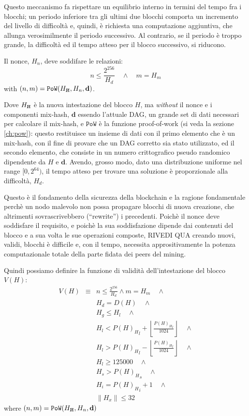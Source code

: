 \documentclass[9pt,oneside]{amsart}
\newcommand{\hcancel}[1]{%
    \tikz[baseline=(tocancel.base)]{
        \node[inner sep=0pt,outer sep=0pt] (tocancel) {#1};
        \draw[black] (tocancel.south west) -- (tocancel.north east);
    }%
}%
\begin{document}
\begin{multicols}{2}
Questo meccanismo fa rispettare un equilibrio interno in termini del tempo fra i blocchi; un periodo inferiore tra gli ultimi due blocchi comporta un incremento del livello di difficoltà e, quindi, è richiesta una computazione aggiuntiva, che allunga verosimilmente il periodo successivo. Al contrario, se il periodo è troppo grande, la difficoltà ed il tempo atteso per il blocco successivo, si riducono.

Il nonce, $H_n$, deve soddifare le relazioni:
\begin{equation}
n \leqslant \frac{2^{256}}{H_d} \quad \wedge \quad m = H_m
\end{equation}
with $(n, m) = \mathtt{PoW}(H_{\hcancel{n}}, H_n, \mathbf{d})$.

Dove $H_{\hcancel{n}}$ è la nuova intestazione del blocco $H$, ma \textit{without} il nonce e i componenti mix-hash, $\mathbf{d}$ essendo l'attuale DAG, un grande set di dati necessari per calcolare il mix-hash, e $\mathtt{PoW}$ è la funzione proof-of-work (si veda la sezione \ref{ch:pow}): questo restituisce un insieme di dati con il primo elemento che è un mix-hash, con il fine di provare che un DAG corretto sia stato utilizzato, ed il secondo elemento, che consiste in un numero crittografico pseudo randomico dipendente da $H$ e $\mathbf{d}$. Avendo, grosso modo, dato una distribuzione uniforme nel range $[0, 2^{64})$, il tempo atteso per trovare una soluzione è proporzionale alla difficoltà, $H_d$.

Questo è il fondamento della sicurezza della blockchain e la ragione fondamentale perchè un nodo malevolo non possa propagare blocchi di nuova creazione, che altrimenti sovrascrivebbero (``rewrite'') i precedenti. Poichè il nonce deve soddisfare il requisito, e poichè la sua soddisfazione dipende dai contenuti del blocco e a sua volta le sue operazioni composte, RIVEDI QUA creando nuovi, validi, blocchi è difficile e, con il tempo, necessita apprositivamente la potenza computazionale totale della parte fidata dei peers del mining.

Quindi possiamo definire la funzione di validità dell'intestazione del blocco $V(H)$:
\begin{eqnarray}
V(H) & \equiv &  n \leqslant \frac{2^{256}}{H_d} \wedge m = H_m \quad \wedge \\
& & H_d = D(H) \quad \wedge \\
& & H_g \le H_l  \quad \wedge \\
& & H_l < {P(H)_H}_l + \left\lfloor\frac{{P(H)_H}_l}{1024}\right\rfloor  \quad \wedge \\
& & H_l > {P(H)_H}_l - \left\lfloor\frac{{P(H)_H}_l}{1024}\right\rfloor  \quad \wedge \\
& & H_l \geqslant 125000  \quad \wedge \\
& & H_s > {P(H)_H}_s \quad \wedge \\
& & H_i = {P(H)_H}_i +1 \quad \wedge \\
& & \lVert H_x \rVert \le 32
\end{eqnarray}
where $(n, m) = \mathtt{PoW}(H_{\hcancel{n}}, H_n, \mathbf{d})$


\end{multicols}
\end{document}
